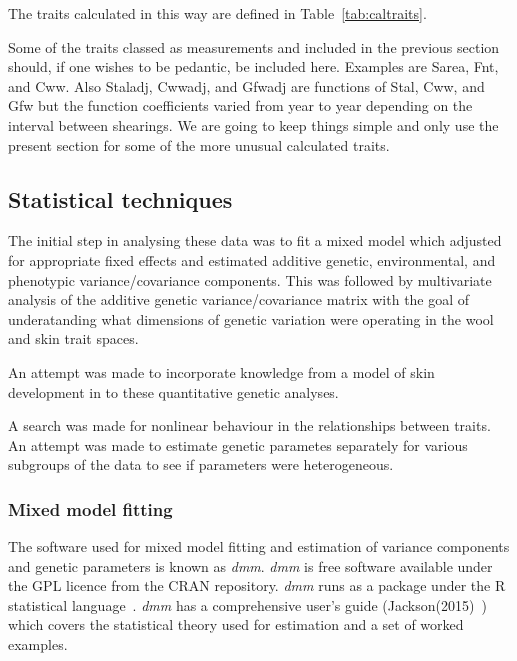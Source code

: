 \documentclass[titlepage]{article}  %
\begin{document}
The traits calculated in this way are defined in Table~\ref{tab:caltraits}.


 
Some of the traits classed as measurements and included in the previous section should, if one wishes to be pedantic, be included here. Examples are Sarea, Fnt, and Cww. Also Staladj, Cwwadj, and Gfwadj are functions of Stal, Cww, and Gfw but the function coefficients varied from year to year depending on the interval between shearings. We are going to keep things simple and only use the present section for some of the more unusual calculated traits.


\subsection{Statistical techniques}
\label{sect:stats}
The initial step in analysing these data was to fit a mixed model which adjusted for appropriate fixed effects and estimated additive genetic, environmental, and phenotypic variance/covariance components. This was followed by multivariate analysis of the additive genetic variance/covariance matrix with the goal of underatanding what dimensions of genetic variation were operating in the wool and skin trait spaces. 

An attempt was made to incorporate knowledge from a model of skin development in to these quantitative genetic analyses.

A search was made for nonlinear behaviour in the relationships between traits.
An attempt was made to estimate genetic parametes separately for various subgroups of the data to see if parameters were heterogeneous.

\subsubsection{Mixed model fitting}
The software used for mixed model fitting and estimation of variance components and genetic parameters is known as {\em dmm}. {\em dmm} is free software available under the GPL licence from the CRAN repository. {\em dmm} runs as a package under the R statistical language~\cite{rprog:13}. {\em dmm} has a comprehensive user's guide (Jackson(2015)~\cite{jack:15b}) which covers the statistical theory used for estimation and a set of worked examples.
\end{document}
